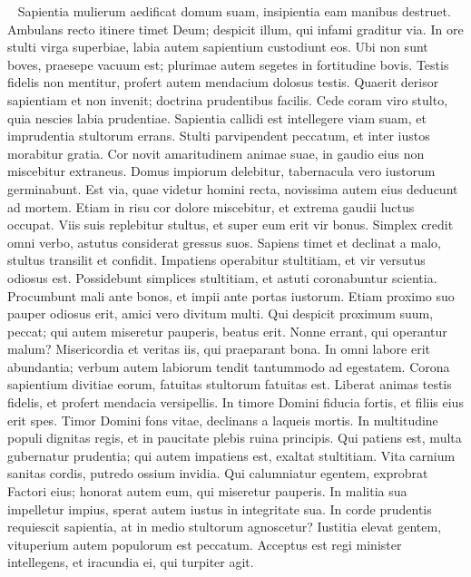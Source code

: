 \begin{biblechapter}   
\verse Sapientia mulierum aedificat domum suam, insipientia eam manibus destruet. 
\verse Ambulans recto itinere timet Deum; despicit illum, qui infami graditur via. 
\verse In ore stulti virga superbiae, labia autem sapientium custodiunt eos. 
\verse Ubi non sunt boves, praesepe vacuum est; plurimae autem segetes in fortitudine bovis. 
\verse Testis fidelis non mentitur, profert autem mendacium dolosus testis. 
\verse Quaerit derisor sapientiam et non invenit; doctrina prudentibus facilis. 
\verse Cede coram viro stulto, quia nescies labia prudentiae. 
\verse Sapientia callidi est intellegere viam suam, et imprudentia stultorum errans. 
\verse Stulti parvipendent peccatum, et inter iustos morabitur gratia. 
\verse Cor novit amaritudinem animae suae, in gaudio eius non miscebitur extraneus. 
\verse Domus impiorum delebitur, tabernacula vero iustorum germinabunt. 
\verse Est via, quae videtur homini recta, novissima autem eius deducunt ad mortem. 
\verse Etiam in risu cor dolore miscebitur, et extrema gaudii luctus occupat. 
\verse Viis suis replebitur stultus, et super eum erit vir bonus. 
\verse Simplex credit omni verbo, astutus considerat gressus suos. 
\verse Sapiens timet et declinat a malo, stultus transilit et confidit. 
\verse Impatiens operabitur stultitiam, et vir versutus odiosus est. 
\verse Possidebunt simplices stultitiam, et astuti coronabuntur scientia. 
\verse Procumbunt mali ante bonos, et impii ante portas iustorum. 
\verse Etiam proximo suo pauper odiosus erit, amici vero divitum multi. 
\verse Qui despicit proximum suum, peccat; qui autem miseretur pauperis, beatus erit. 
\verse Nonne errant, qui operantur malum? Misericordia et veritas iis, qui praeparant bona. 
\verse In omni labore erit abundantia; verbum autem labiorum tendit tantummodo ad egestatem. 
\verse Corona sapientium divitiae eorum, fatuitas stultorum fatuitas est. 
\verse Liberat animas testis fidelis, et profert mendacia versipellis. 
\verse In timore Domini fiducia fortis, et filiis eius erit spes. 
\verse Timor Domini fons vitae, declinans a laqueis mortis. 
\verse In multitudine populi dignitas regis, et in paucitate plebis ruina principis. 
\verse Qui patiens est, multa gubernatur prudentia; qui autem impatiens est, exaltat stultitiam. 
\verse Vita carnium sanitas cordis, putredo ossium invidia. 
\verse Qui calumniatur egentem, exprobrat Factori eius; honorat autem eum, qui miseretur pauperis. 
\verse In malitia sua impelletur impius, sperat autem iustus in integritate sua. 
\verse In corde prudentis requiescit sapientia, at in medio stultorum agnoscetur? 
\verse Iustitia elevat gentem, vituperium autem populorum est peccatum. 
\verse Acceptus est regi minister intellegens, et iracundia ei, qui turpiter agit. 
\end{biblechapter}

